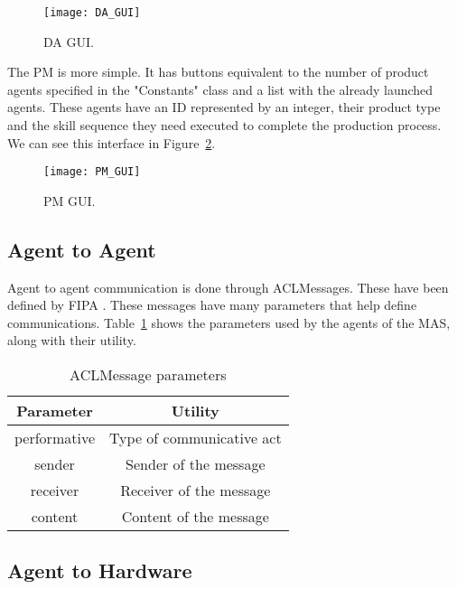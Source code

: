 \begin{figure}[h!]
	\centering
	\texttt{[image: DA\_GUI]}
	\caption{\acrlong{DA} \acrlong{GUI}.}
	\label{fig:da_gui}
\end{figure}

The \acrshort{PM} is more simple. It has buttons equivalent to the number of product agents specified in the "Constants" class and a list with the already launched agents. These agents have an ID represented by an integer, their product type and the skill sequence they need executed to complete the production process. We can see this interface in Figure~\ref{fig:pm_gui}.

\begin{figure}[h!]
	\centering
	\texttt{[image: PM\_GUI]}
	\caption{\acrlong{PM} \acrlong{GUI}.}
	\label{fig:pm_gui}
\end{figure}

\subsection{Agent to Agent}
\label{subsec:agent_to_agent_interface}

Agent to agent communication is done through ACLMessages. These have been defined by \acrshort{FIPA} \cite{FIPA_ACLMessage}. These messages have many parameters that help define communications. Table~\ref{tb:aclmessage_parameters} shows the parameters used by the agents of the \acrshort{MAS}, along with their utility.

\begin{table}[h!]
	\centering
	\caption{ACLMessage parameters}
	\begin{tabular}{|c|c|}
		\hline
		Parameter    & Utility                   \\ \hline
		performative & Type of communicative act \\ \hline
		sender       & Sender of the message     \\ \hline
		receiver     & Receiver of the message   \\ \hline
		content      & Content of the message    \\ \hline
	\end{tabular}
	\label{tb:aclmessage_parameters}
\end{table}

\subsection{Agent to Hardware}
\label{subsec:agent_to_hardware_interface}

